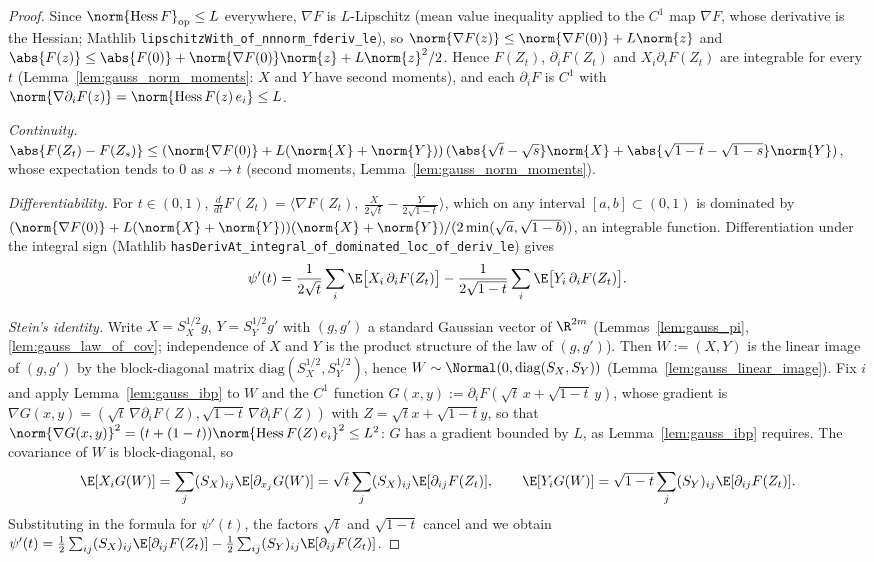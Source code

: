 \begin{proof}
\leanok
{}
Since $\norm{\mathrm{Hess}\,F}_{\mathrm{op}}\le L$ everywhere, $\nabla F$ is $L$-Lipschitz
(mean value inequality applied to the $C^1$ map $\nabla F$, whose derivative is the Hessian;
Mathlib \texttt{lipschitzWith\_of\_nnnorm\_fderiv\_le}), so
$\norm{\nabla F(z)} \le \norm{\nabla F(0)} + L\norm{z}$ and $\abs{F(z)} \le \abs{F(0)} + \norm{\nabla F(0)}\norm{z} + L\norm{z}^2/2$.
Hence $F(Z_t)$, $\partial_iF(Z_t)$ and $X_i\partial_iF(Z_t)$ are integrable for every $t$
(Lemma~\ref{lem:gauss_norm_moments}: $X$ and $Y$ have second moments), and each
$\partial_iF$ is $C^1$ with $\norm{\nabla\partial_iF(z)} = \norm{\mathrm{Hess}\,F(z)\,e_i}\le L$.

\emph{Continuity.} $\abs{F(Z_t) - F(Z_s)} \le (\norm{\nabla F(0)} + L(\norm{X}+\norm{Y}))\,(\abs{\sqrt t-\sqrt s}\norm{X} + \abs{\sqrt{1-t}-\sqrt{1-s}}\norm{Y})$,
whose expectation tends to $0$ as $s\to t$ (second moments, Lemma~\ref{lem:gauss_norm_moments}).

\emph{Differentiability.} For $t \in (0,1)$, $\frac{d}{dt}F(Z_t) = \big\langle\nabla F(Z_t),\ \tfrac{X}{2\sqrt t} - \tfrac{Y}{2\sqrt{1-t}}\big\rangle$,
which on any interval $[a,b]\subset(0,1)$ is dominated by
$(\norm{\nabla F(0)} + L(\norm{X}+\norm{Y}))(\norm{X}+\norm{Y})/(2\min(\sqrt a,\sqrt{1-b}))$, an
integrable function. Differentiation under the integral sign (Mathlib
\texttt{hasDerivAt\_integral\_of\_dominated\_loc\_of\_deriv\_le}) gives
\[
  \psi'(t) = \frac{1}{2\sqrt t}\sum_i\E\big[X_i\,\partial_iF(Z_t)\big]
  - \frac{1}{2\sqrt{1-t}}\sum_i\E\big[Y_i\,\partial_iF(Z_t)\big].
\]

\emph{Stein's identity.} Write $X = S_X^{1/2}g$, $Y = S_Y^{1/2}g'$ with $(g,g')$ a standard
Gaussian vector of $\R^{2m}$ (Lemmas~\ref{lem:gauss_pi}, \ref{lem:gauss_law_of_cov}; independence
of $X$ and $Y$ is the product structure of the law of $(g,g')$). Then $W := (X,Y)$ is the linear
image of $(g,g')$ by the block-diagonal matrix $\mathrm{diag}(S_X^{1/2},S_Y^{1/2})$, hence
$W\sim\Normal(0,\mathrm{diag}(S_X,S_Y))$ (Lemma~\ref{lem:gauss_linear_image}). Fix $i$ and apply
Lemma~\ref{lem:gauss_ibp} to $W$ and the $C^1$ function
$G(x,y) := \partial_iF(\sqrt t\,x + \sqrt{1-t}\,y)$, whose gradient is
$\nabla G(x,y) = (\sqrt t\,\nabla\partial_iF(Z), \sqrt{1-t}\,\nabla\partial_iF(Z))$ with
$Z = \sqrt t x+\sqrt{1-t}y$, so that
$\norm{\nabla G(x,y)}^2 = (t + (1-t))\norm{\mathrm{Hess}\,F(Z)\,e_i}^2\le L^2$: $G$ has a
gradient bounded by $L$, as Lemma~\ref{lem:gauss_ibp} requires.
The covariance of $W$ is block-diagonal, so
\[
  \E[X_iG(W)] = \sum_j (S_X)_{ij}\E[\partial_{x_j}G(W)] = \sqrt t\sum_j(S_X)_{ij}\E[\partial_{ij}F(Z_t)],
  \qquad
  \E[Y_iG(W)] = \sqrt{1-t}\sum_j(S_Y)_{ij}\E[\partial_{ij}F(Z_t)].
\]
Substituting in the formula for $\psi'(t)$, the factors $\sqrt t$ and $\sqrt{1-t}$ cancel and
we obtain $\psi'(t) = \frac12\sum_{ij}(S_X)_{ij}\E[\partial_{ij}F(Z_t)] - \frac12\sum_{ij}(S_Y)_{ij}\E[\partial_{ij}F(Z_t)]$.
\end{proof}

